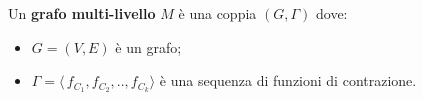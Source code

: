 \begin{minipage}[t]{\textwidth}
\begin{definizione}
    Un \textbf{grafo multi-livello} $M$ \`e una coppia $(G, \Gamma)$ dove:
        \begin{itemize}
            \item $G = (V, E)$ \`e un grafo;
            \item $\Gamma = \langle \, f_{C_1}, f_{C_2}, .., f_{C_k} \rangle$ \`e una sequenza di funzioni di contrazione.
        \end{itemize}
    \end{definizione}
\end{minipage}
